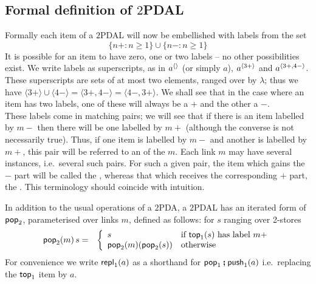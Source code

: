 \subsection{Formal definition of $2$PDAL}

Formally each item of a $2$PDAL will now be embellished with
labels from the set
\[
\{n{+} : n \geq 1 \} \cup \{n{-} : n \geq 1 \}
\]
It is possible for an item to have zero, one or two labels -- no
other possibilities exist. We write labels as superscripts, as in
${a}^{\langle{}\rangle}$ (or simply $a$), ${a}^{\langle{3+}\rangle}$ and
${a}^{\langle{3+, 4-}\rangle}$. These superscripts are sets of at most two
elements, ranged over by $\lambda$; thus we have ${\langle 3+
\rangle} \cup {\langle 4- \rangle} = \langle 3+, 4- \rangle =
\langle 4-, 3+\rangle$. We shall see that in the case where an
item has two labels, one of these will always be a $+$ and the
other a $-$.\\

These labels come in matching pairs; we will see that if there is
an item labelled by $m-$ then there will be one labelled by $m+$
(although the converse is not necessarily true).  Thus, if one
item is labelled by $m-$ and another is labelled by $m+$, this
pair will be referred to an  of the
 $m$. Each link $m$ may have several instances,
i.e.~several such pairs. For such a given pair, the item which
gains the $-$ part will be called the ,
whereas that which receives the corresponding $+$ part, the
. This terminology should coincide with
intuition.


In addition to the usual operations of a $2$PDA, a $2$PDAL has an
iterated form of ${\sf pop}_2$, parameterised over links $m$, defined
as follows: for $s$ ranging over 2-stores
\begin{eqnarray}
\nonumber {\sf pop}_2(m) \, s & = & \left \{
\begin{array}{ll}
s & \mbox{if ${\sf top}_1(s)$ has label $m+$}\\
{\sf pop}_2(m)({\sf pop}_2(s)) & \mbox{otherwise}
\end{array}
\right .
\end{eqnarray}
For convenience we write ${\sf repl}_1(a)$ as a shorthand for ${\sf pop}_1
\mathbin{\hbox{\boldmath{$;$}}} {\sf push}_1(a)$ i.e.~replacing the ${\sf top}_1$ item by $a$. \\

